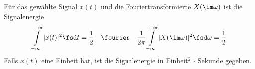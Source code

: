 \begin{Loesung}
Für das gewählte Signal $x(t)$ und die Fouriertransformierte $X(\im\omega)$ ist die
Signalenergie
\begin{equation}
  \int\limits_{-\infty}^{+\infty} |x(t)|^2 \fsd t
  =\frac{1}{2}\quad\fourier\quad
  \frac{1}{2\pi}\int\limits_{-\infty}^{+\infty} |X(\im\omega)|^2 \fsd \omega=\frac{1}{2}
\end{equation}
Falls $x(t)$ eine Einheit hat, ist die Signalenergie in Einheit$^2$ $\cdot$ Sekunde
gegeben.
\end{Loesung}



